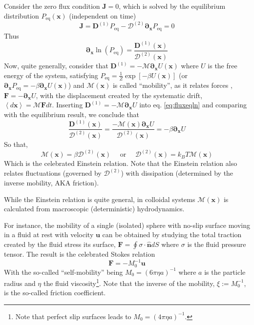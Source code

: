 \documentclass[ twoside,openright,titlepage,numbers=noenddot,%
headinclude,footinclude,cleardoublepage=empty,abstract=on,
BCOR=5mm,paper=a4,fontsize=11pt, dvipsnames
]{scrreprt}
\renewcommand{\vec}[1]{\bm{#1}}
\newcommand{\tens}[1]{\bm{\mathcal{#1}}}
\newcommand{\kT}{k_B T}
\newcommand{\pvel}{u}
\begin{document}
Consider the zero flux condition $\vec{J}=0$, which is solved by the equilibrium distribution $P_{\text{eq}}(\vec{x})$ (independent on time)
\begin{equation}
  \label{eq:fluxeq}
  \vec{J} = \vec{D}^{(1)}P_{\text{eq}} - \tens{D}^{(2)}\vec{\partial}_{\vec{x}}P_{\text{eq}} = 0
\end{equation}
Thus
\begin{equation}
  \label{eq:fluxeqln}
\vec{\partial}_{\vec{x}}\ln \left(P_{\text{eq}}\right) = \frac{\vec{D}^{(1)}(\vec{x})}{\tens{D}^{(2)}(\vec{x})}
\end{equation}
Now, quite generally, consider that $\vec{D}^{(1)} = -\tens{M}\vec{\partial}_{\vec{x}}U(\vec{x})$ where $U$ is the free energy of the system, satisfying $P_{\text{eq}} = \frac{1}{Z}\exp\left[-\beta U(\vec{x})\right]$ (or $\vec{\partial}_{\vec{x}}P_{\text{eq}} = -\beta \vec{\partial}_{\vec{x}} U(\vec{x})$) and $\tens{M}(\vec{x})$ is called ``mobility'', as it relates forces ,$\vec{F} = -\vec{\partial}_{\vec{x}}U$, with the displacement created by the systematic drift, $\left\langle d\vec{x}\right\rangle = \tens{M}\vec{F} dt$. Inserting $\vec{D}^{(1)} = -\tens{M}\vec{\partial}_{\vec{x}}U$ into eq. \eqref{eq:fluxeqln} and comparing with the equilibrium result, we conclude that
\begin{equation}
  \frac{\vec{D}^{(1)}(\vec{x})}{\tens{D}^{(2)}(\vec{x})} = \frac{-\tens{M}(\vec{x})\vec{\partial}_{\vec{x}}U}{\tens{D}^{(2)}(\vec{x})} = -\beta\vec{\partial}_{\vec{x}}U
\end{equation}
So that,
\begin{equation}
  \label{eq:einsteinrel}
  \tens{M}(\vec{x}) = \beta\tens{D}^{(2)}(\vec{x})\quad\text{ or }\quad\tens{D}^{(2)}(\vec{x}) = \kT\tens{M}(\vec{x})
\end{equation}
Which is the celebrated Einstein relation. Note that the Einstein relation also relates fluctuations (governed by $\tens{D}^{(2)}$) with dissipation (determined by the inverse mobility, AKA friction).

While the Einstein relation is quite general, in colloidal systems $\tens{M}(\vec{x})$ is calculated from macroscopic (deterministic) hydrodynamics. 

For instance, the mobility of a single (isolated) sphere with no-slip surface moving in a fluid at rest with velocity $\vec{\pvel}$ can be obtained\cite{Dhont1996} by studying the total traction created by the fluid stress its surface, $\vec{F} = \oint\tens{\sigma}\cdot \hat{\vec{n}}dS$ where $\tens{\sigma}$ is the fluid pressure tensor. The result is the celebrated Stokes relation
\begin{equation}
  \label{eq:stokesrel}
  \vec{F} = -M_0^{-1} \vec{\pvel}
\end{equation}
With the so-called ``self-mobility'' being $M_0 = \left(6\pi\eta a\right)^{-1}$ where $a$ is the particle radius and $\eta$ the fluid viscosity\footnote{Note that perfect slip surfaces leads to $M_0 = (4\pi\eta a)^{-1}$.}. Note that the inverse of the mobility, $\xi := M_0^{-1}$, is the so-called friction coefficient.
\end{document}
